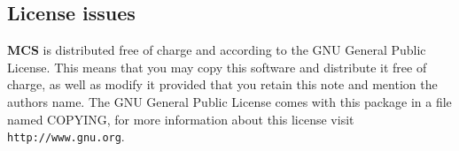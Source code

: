 \documentclass[12pt,titlepage]{article}
\newcommand{\mcs}{\textbf{MCS} }
\begin{document}
%
%
%
%
%
%
\subsection{License issues}
\label{sec-license}
\mcs is distributed free of charge and according to the GNU General
Public License. This means that you may copy this software and
distribute it free of charge, as well as modify it provided that you
retain this note and mention the authors name. The GNU General Public
License comes with this package in a file named COPYING, for more
information about this license visit \verb|http://www.gnu.org|.
\end{document}
